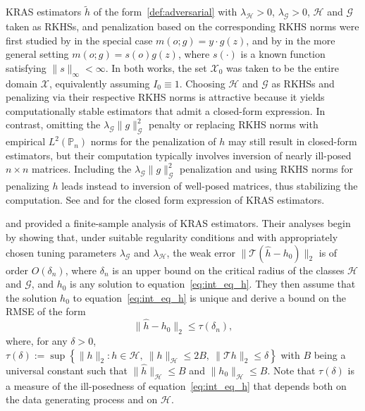\documentclass[twoside,11pt]{article}
\newcommand{\mc}{\mathcal}
\begin{document}
KRAS estimators $\tilde h$ of the form~\eqref{def:adversarial} with $\lambda_\mathcal{H} > 0$, $\lambda_\mathcal{G} > 0$, $\mathcal{H}$ and $\mathcal{G}$ taken as RKHSs, and penalization based on the corresponding RKHS norms were first studied by \citet{dikkala2020minimax} in the special case $m(o;g) = y \cdot g(z)$, and by \citet{ghassami2022minimax} in the more general setting $m(o;g) = s(o) g(z)$, where $s(\cdot)$ is a known function satisfying $\|s\|_\infty < \infty$. In both works, the set $\mathcal{X}_0$ was taken to be the entire domain $\mathcal{X}$, equivalently assuming $I_0 \equiv 1$. Choosing $\mathcal{H}$ and $\mathcal{G}$ as RKHSs and penalizing via their respective RKHS norms is attractive because it yields computationally stable estimators that admit a closed-form expression. In contrast, omitting the $\lambda_\mathcal{G} \|g\|_\mathcal{G}^2$ penalty or replacing RKHS norms with empirical $L^2(\mathbb{P}_n)$ norms for the penalization of $h$ may still result in closed-form estimators, but their computation typically involves inversion of nearly ill-posed $n \times n$ matrices. Including the $\lambda_\mathcal{G} \|g\|_\mathcal{G}^2$ penalization and using RKHS norms for penalizing $h$ leads instead to inversion of well-posed matrices, thus stabilizing the computation. See \citet{dikkala2020minimax} and \citet{ghassami2022minimax} for the closed form expression of KRAS estimators.

\cite{dikkala2020minimax} and \cite{ghassami2022minimax} provided a finite-sample analysis of KRAS estimators. Their analyses begin by showing that, under suitable regularity conditions and with appropriately chosen tuning parameters $\lambda_{\mathcal{G}}$ and $\lambda_{\mathcal{H}}$, the weak error $\|\mathcal{T}(\hat{h} - h_0)\|_2$ is of order $O(\delta_n)$, where $\delta_n$ is an upper bound on the critical radius of the classes $\mathcal{H}$ and $\mathcal{G}$, and $h_0$ is any solution to equation~\eqref{eq:int_eq_h}. They then assume that the solution $h_0$ to equation~\eqref{eq:int_eq_h} is unique and derive a bound on the RMSE of the form
\begin{equation}
    \|\hat{h} - h_0\|_2 \le \tau(\delta_n),\label{eq:mip}
\end{equation}
where, for any $\delta > 0$,
$ \tau(\delta) := \sup \left\{ \|h\|_2 : h \in \mathcal{H},\ \|h\|_{\mathcal{H}} \le 2B,\ \|\mathcal{T} h\|_2 \le \delta \right\}$ 
with $B$ being a universal constant such that $\|\hat{h}\|_{\mathcal{H}} \le B$ and $\|h_0\|_{\mathcal{H}} \le B$. Note that $\tau(\delta)$ is a measure of the ill-posedness of equation~\eqref{eq:int_eq_h} that depends both on the data generating process and on $\mc{H}$. 
\end{document}
